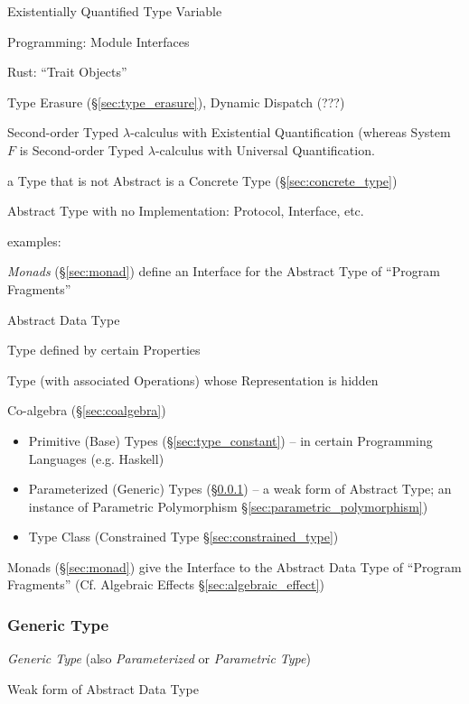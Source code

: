 Existentially Quantified Type Variable

Programming: Module Interfaces

Rust: ``Trait Objects''

Type Erasure (\S\ref{sec:type_erasure}), Dynamic Dispatch (???)

Second-order Typed $\lambda$-calculus with Existential Quantification
(whereas System $F$ is Second-order Typed $\lambda$-calculus with
Universal Quantification.

a Type that is not Abstract is a Concrete Type
(\S\ref{sec:concrete_type})

Abstract Type with no Implementation: Protocol, Interface, etc.

examples:

\emph{Monads} (\S\ref{sec:monad}) define an Interface for the Abstract
Type of ``Program Fragments''


\asterism


Abstract Data Type

Type defined by certain Properties %

Type (with associated Operations) whose Representation is hidden

Co-algebra (\S\ref{sec:coalgebra})

\begin{itemize}
  \item Primitive (Base) Types (\S\ref{sec:type_constant}) -- in
    certain Programming Languages (e.g. Haskell)
  \item Parameterized (Generic) Types (\S\ref{sec:generic_type}) -- a
    weak form of Abstract Type; an instance of Parametric Polymorphism
    \S\ref{sec:parametric_polymorphism})
  \item Type Class (Constrained Type \S\ref{sec:constrained_type})
\end{itemize}

Monads (\S\ref{sec:monad}) give the Interface to the Abstract Data
Type of ``Program Fragments'' (\fist Cf. Algebraic Effects
\S\ref{sec:algebraic_effect})



\subsubsection{Generic Type}\label{sec:generic_type}

\emph{Generic Type} (also \emph{Parameterized} or \emph{Parametric
  Type})

Weak form of Abstract Data Type

